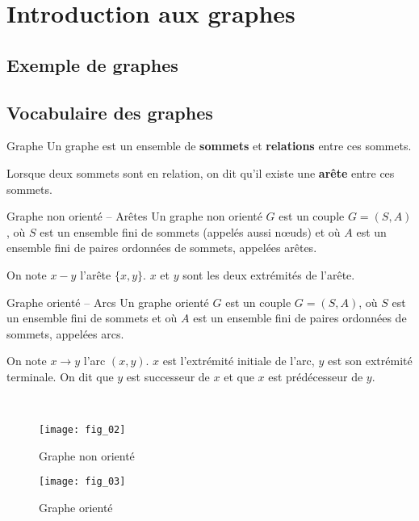 \section{Introduction aux graphes}

\subsection{Exemple de graphes}

\subsection{Vocabulaire des graphes}

\begin{defi}{Graphe}%
Un graphe est un ensemble de \textbf{sommets} et  \textbf{relations} entre ces sommets.

Lorsque deux sommets sont en relation, on dit qu'il existe une \textbf{arête} entre ces sommets.
\end{defi}

\begin{defi}{Graphe non orienté -- Arêtes}
Un graphe non orienté $G$ est un couple $G=(S,A)$, où $S$ est un ensemble fini de sommets (appelés aussi n\oe uds)  et où $A$ est un ensemble fini de paires ordonnées de sommets, appelées arêtes.

On note $x - y$ l'arête $\{x,y\}$. $x$ et $y$ sont les deux extrémités de l'arête.
\end{defi}

\begin{defi}{Graphe orienté -- Arcs}\cite{ref_01}
Un graphe orienté $G$ est un couple $G=(S,A)$, où $S$ est un ensemble fini de sommets et où $A$ est un ensemble fini de paires ordonnées de sommets, appelées arcs.

On note $x\to y$ l'arc $(x,y)$. $x$ est l'extrémité initiale de l'arc, $y$ est son extrémité terminale. On dit que $y$ est successeur de $x$ et que $x$ est prédécesseur de $y$. 
\end{defi}

\begin{exemple}~\\

\begin{multicols}{2}
\begin{figure}[H]
\texttt{[image: fig\_02]}
\captionsetup{justification=centering}
\caption{Graphe non orienté \label{fig_02}}
\end{figure}


\begin{figure}[H]
\texttt{[image: fig\_03]}
\captionsetup{justification=centering}
\caption{Graphe orienté}
\end{figure}
\end{multicols}

\end{exemple}

